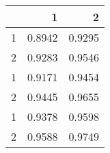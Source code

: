 \begin{tabular}{lrr}
\toprule
{} &       1 &       2 \\
\midrule
1 &  0.8942 &  0.9295 \\
2 &  0.9283 &  0.9546 \\
1 &  0.9171 &  0.9454 \\
2 &  0.9445 &  0.9655 \\
1 &  0.9378 &  0.9598 \\
2 &  0.9588 &  0.9749 \\
\bottomrule
\end{tabular}
